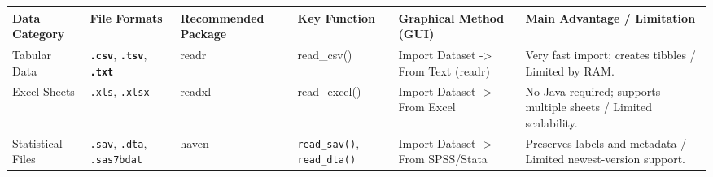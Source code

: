 \documentclass[
  doc,
  longtable,
  a4paper,
  nolmodern,
  notxfonts,
  notimes,
  colorlinks=true,linkcolor=blue,citecolor=blue,urlcolor=blue]{apa7}
\newcounter{none} %
\begin{document}
\begin{table}

{\caption{{The Comparison Between Packages}{\label{tbl-packagescomp}}}}

{\def\LTcaptype{none} %
\begin{longtable}[]{@{}
  >{\raggedright\arraybackslash}p{}
  >{\raggedright\arraybackslash}p{}
  >{\raggedright\arraybackslash}p{}
  >{\raggedright\arraybackslash}p{}
  >{\raggedright\arraybackslash}p{}
  >{\raggedright\arraybackslash}p{}@{}}
\toprule\noalign{}
\begin{minipage}[b]{\linewidth}\raggedright
Data Category
\end{minipage} & \begin{minipage}[b]{\linewidth}\raggedright
File Formats
\end{minipage} & \begin{minipage}[b]{\linewidth}\raggedright
Recommended Package
\end{minipage} & \begin{minipage}[b]{\linewidth}\raggedright
Key Function
\end{minipage} & \begin{minipage}[b]{\linewidth}\raggedright
Graphical Method (GUI)
\end{minipage} & \begin{minipage}[b]{\linewidth}\raggedright
Main Advantage / Limitation
\end{minipage} \\
\midrule\noalign{}
\endhead
\bottomrule\noalign{}
\endlastfoot
Tabular Data & \textbf{\texttt{.csv}}, \textbf{\texttt{.tsv}},
\textbf{\texttt{.txt}} & readr & read\_csv() & Import Dataset
-\textgreater{} From Text (readr) & Very fast import; creates tibbles /
Limited by RAM. \\
Excel Sheets & \texttt{.xls}, \texttt{.xlsx} & readxl & read\_excel() &
Import Dataset -\textgreater{} From Excel & No Java required; supports
multiple sheets / Limited scalability. \\
Statistical Files & \texttt{.sav}, \texttt{.dta}, \texttt{.sas7bdat} &
haven & \texttt{read\_sav()}, \texttt{read\_dta()} & Import Dataset
-\textgreater{} From SPSS/Stata & Preserves labels and metadata /
Limited newest-version support. \\

\end{longtable}}
\end{table}
\end{document}
